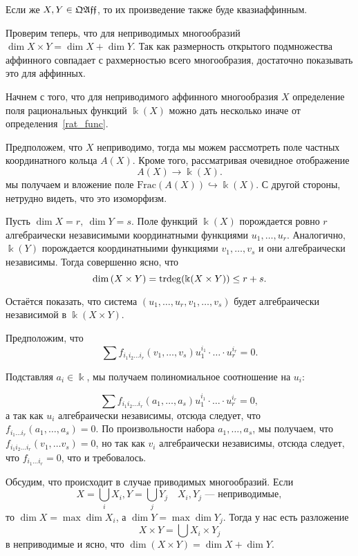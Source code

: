 	
	Если же $X, Y \in \mathfrak{Q}\mathfrak{A}\mathfrak{f}\mathfrak{f}$, то их произведение также буде квазиаффинным. 

	Проверим теперь, что для неприводимых многообразий $\dim{X \times Y} = \dim{X} + \dim{Y}$. Так как размерность открытого подмножества аффинного совпадает с рахмерностью всего многообразия, достаточно показывать это для аффинных. 

	Начнем с того, что для неприводимого аффинного многообразия $X$ определение поля рациональных функций $\Bbbk(X)$ можно дать несколько иначе от определения~\ref{rat_func}. 

	Предположем, что $X$ неприводимо, тогда мы можем рассмотреть поле частных координатного кольца $A(X)$. Кроме того, рассматривая очевидное отображение 
	\[
		A(X) \to \Bbbk(X).
	\]
	мы получаем и вложение поле $\mathrm{Frac}(A(X)) \hookrightarrow \Bbbk(X)$. С другой стороны, нетрудно видеть, что это изоморфизм. 

	Пусть $\dim{X} = r, \ \dim{Y} = s$. Поле функций $\Bbbk(X)$ порождается ровно  $r$ алгебраически независимыми координатными функциями $u_1, \ldots, u_r$. Аналогично, $\Bbbk(Y)$ порождается координатныими функциями $v_1, \ldots, v_s$ и они алгебраически независимы. Тогда совершенно ясно, что 
	\[
		\dim{(X \times Y)} = \mathrm{trdeg}\lr*{\Bbbk(X \times Y)} \le r + s.
	\]

	Остаётся показать, что система $(u_1, \ldots, u_r, v_1, \ldots, v_s)$ будет алгебраически независимой в $\Bbbk(X \times Y)$. 

	Предположим, что 
	\[
		\sum f_{i_1 i_2 \ldots i_r}(v_1, \ldots, v_s) u_1^{i_1} \cdot \ldots \cdot u_{r}^{i_r} = 0.
	\]

	Подставляя $a_i \in \Bbbk$, мы получаем полиномиальное соотношение на $u_i:$

	\[
		\sum f_{i_1 i_2 \ldots i_r}(a_1, \ldots, a_s) u_1^{i_1} \cdot \ldots \cdot u_{r}^{i_r} = 0,
	\]
	а так как $u_i$ алгебраически независимы, отсюда следует, что $f_{i_1 \ldots i_r}(a_1, \ldots, a_s) = 0$. По произвольности набора  $a_1, \ldots, a_s$, мы получаем, что $f_{i_1 i_2 \ldots i_r}(v_1, \ldots v_s) = 0$, но так как $v_i$ алгебраически независимы, отсюда следует, что $f_{i_1 \ldots i_r} = 0$, что и требовалось. 

	Обсудим, что происходит в случае приводимых многообразий. Если 
	\[
		X = \bigcup_{i} X_{i}, Y = \bigcup_{j} Y_{j} \quad X_{i}, Y_{j} \text{~--- неприводимые},
 	\]
 	то $\dim{X} = \max{\dim{X_i}}$, а $\dim{Y} = \max{\dim{Y_j}}$. Тогда у нас есть разложение 
 	\[
 		X \times Y = \bigcup X_i \times Y_j 
 	\]
 	в неприводимые и ясно, что $\dim{(X \times Y)} = \dim{X} + \dim{Y}$. 

